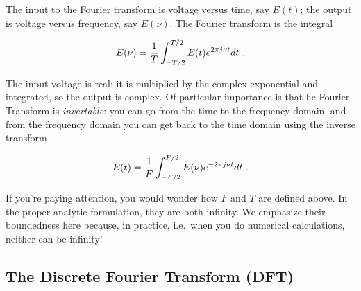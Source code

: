 \documentclass[11pt,preprint]{aastex}
\begin{document}
        The input to the Fourier transform is voltage versus time, say
$E(t)$; the output is voltage versus frequency, say $E(\nu)$.  The Fourier
transform is the integral
 
\begin{equation}
E(\nu) = {1 \over T} \int_{-T/2}^{T/2} E(t) e^{2 \pi j \nu t} dt \ .
\end{equation}
 
\noindent The input voltage is real; it is multiplied by the complex
exponential and integrated, so the output is complex. Of particular
importance is that he Fourier Transform is {\it invertable}: you can go
from the time to the frequency domain, and from the frequency domain you can
get back to the time domain using the inverse transform

\begin{equation}
E(t) = {1 \over F} \int_{-F/2}^{F/2} E(\nu) e^{-2 \pi j \nu t} dt \ .
\end{equation}
 
 If you're paying attention, you would wonder how
$F$ and $T$ are defined above. In the proper analytic formulation, they
are both infinity. We emphasize their boundedness here because, in
practice, i.e.\ when you do numerical calculations, neither can be
infinity!

\subsection{The Discrete Fourier Transform (DFT)} \label{dft}
\end{document}
